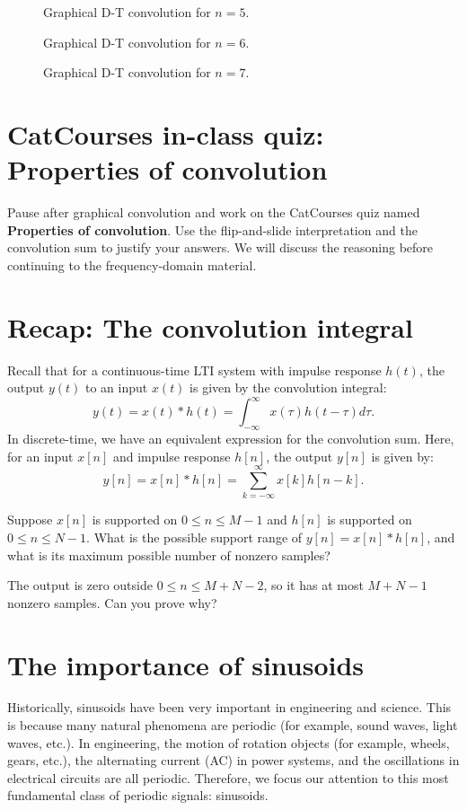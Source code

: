 \begin{figure}[htbp]
  \centering
  \caption{Graphical D-T convolution for $n=5$.}
  \label{fig:w6_conv_n5}
\end{figure}

\begin{figure}[htbp]
  \centering
  \caption{Graphical D-T convolution for $n=6$.}
  \label{fig:w6_conv_n6}
\end{figure}

\begin{figure}[htbp]
  \centering
  \caption{Graphical D-T convolution for $n=7$.}
  \label{fig:w6_conv_n7}
\end{figure}

\clearpage
\section{CatCourses in-class quiz: Properties of convolution}
Pause after graphical convolution and work on the CatCourses quiz named
\textbf{Properties of convolution}. Use the flip-and-slide interpretation
and the convolution sum to justify your answers. We will discuss the
reasoning before continuing to the frequency-domain material.

\section{Recap: The convolution integral}
Recall that for a continuous-time LTI system with impulse response \(h(t)\), the output \(y(t)\) to an input \(x(t)\) is given by the convolution integral:
\[
y(t) = x(t) * h(t) = \int_{-\infty}^{\infty} x(\tau) h(t - \tau) d\tau.
\]
In discrete-time, we have an equivalent expression for the convolution sum. Here, for an input $x[n]$ and impulse response \(h[n]\), the output \(y[n]\) is given by:
\[
y[n] = x[n] * h[n] = \sum_{k=-\infty}^{\infty} x[k] h[n - k].
\]
\begin{popquiz}
  Suppose $x[n]$ is supported on $0\le n\le M-1$ and $h[n]$ is supported
  on $0\le n\le N-1$. What is the possible support range of
  $y[n]=x[n]*h[n]$, and what is its maximum possible number of nonzero samples?

  \popqsplit
  The output is zero outside $0\le n\le M+N-2$, so it has at most
  $M+N-1$ nonzero samples. Can you prove why?
\end{popquiz}
\section{The importance of sinusoids}
Historically, sinusoids have been very important in engineering and science. This is because many natural phenomena are periodic (for example, sound waves, light waves, etc.).  In engineering, the motion of rotation objects (for example, wheels, gears, etc.), the alternating current (AC) in power systems, and the oscillations in electrical circuits are all periodic. Therefore, we focus our attention to this most fundamental class of periodic signals: sinusoids.

